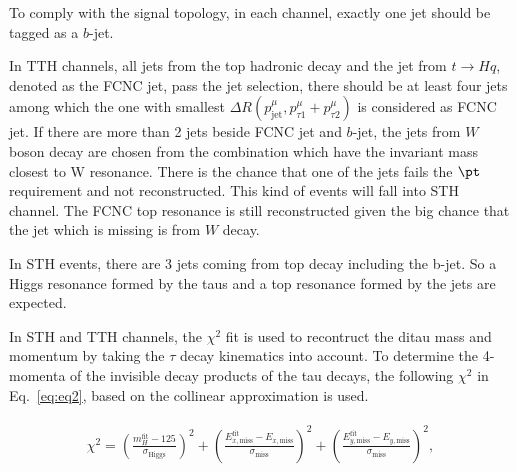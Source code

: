 To comply with the signal topology, in each channel, exactly one jet should be tagged as a $b$-jet. 

In TTH channels, all jets from the top hadronic decay and the jet from $t\to Hq$, denoted as the FCNC jet, pass the jet selection, there should be at least four jets among which the one with smallest $\Delta R(p^{\mu}_{\text{jet}},p^{\mu}_{\tau1}+p^{\mu}_{\tau2})$ is considered as FCNC jet. If there are more than 2 jets beside FCNC jet and $b$-jet, the jets from $W$ boson decay are chosen from the combination which have the invariant mass closest to W resonance. There is the chance that one of the jets fails the $\pt$ requirement and not reconstructed. This kind of events will fall into STH channel. The FCNC top resonance is still reconstructed given the big chance that the jet which is missing is from $W$ decay.

In STH events, there are 3 jets coming from top decay including the b-jet. So a Higgs resonance formed by the taus and a top resonance formed by the jets are expected.

In STH and TTH channels, the $\chi^2$ fit
is used to recontruct the ditau mass and momentum by taking the $\tau$ decay kinematics into account. To determine the 4-momenta of the invisible decay products of the tau decays, the following $\chi^2$ in Eq.~\ref{eq:eq2}, based on the collinear approximation is used.

\begin{eqnarray}
\begin{array}{ll}
\chi^2 = 
\left( \frac{m_{H}^{\text{fit}} - 125}{\sigma_{\text{Higgs}}} \right)^2 + \left( \frac{E_{x,\text{miss}}^{\text{fit}} - E_{x,\text{miss}}}{\sigma_{\text{miss}}} \right)^2 + \left( \frac{E_{y,\text{miss}}^{\text{fit}} - E_{y,\text{miss}}}{\sigma_{\text{miss}}} \right)^2 ,
\end{array}
\label{eq:eq2}
\end{eqnarray}

